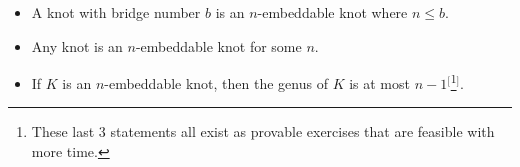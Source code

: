 \documentclass[titlepage]{article}
\numberwithin{figure}{section}
\numberwithin{table}{section}
\numberwithin{equation}{section}
\begin{document}
\begin{itemize}
\begin{figure}[h!]
\begin{subfigure}[b]{0.6\linewidth}
            \label{fig:32knotb}
        \end{subfigure}
        \caption{Solution to \emph{Exercise 5.9}.}
        \label{fig:32knot}
    \end{figure}
    \begin{itemize}
        \item This is far from an ideal method, but it does successfully embed the $5_2$ knot on a genus 2 surface.
        \item Begin with the Conway notation of the $5_2$ knot, namely $32$.
        \item This tells us that the knot can be drawn as the product of two elementary rational tangles (see Figure \ref{fig:32knota}).
        \item Draw a standardly embedded genus 2 surface.
        \item Draw the $2$ tangle on its left handle and the $3$ tangle on its right handle. Note that the choice of left versus right is arbitrary.
        \item Based on the red, blue, and green connections in Figure \ref{fig:32knota}, draw the corresponding connections in Figure \ref{fig:32knotb}.
        \item Since the purple connection cannot leave the torus like in Figure \ref{fig:32knota}, have it pass along the underside of the torus, directly, as in Figure \ref{fig:32knotb}. This will add 3 new crossings, but it will embed $5_2$ on a genus 2 surface.
    \end{itemize}
    \item A knot with bridge number $b$ is an $n$-embeddable knot where $n\leq b$.
    \item Any knot is an $n$-embeddable knot for some $n$.
    \item If $K$ is an $n$-embeddable knot, then the genus of $K$ is at most $n-1$$^[$\footnote{These last 3 statements all exist as provable exercises that are feasible with more time.}$^]$.
\end{itemize}
\end{document}
